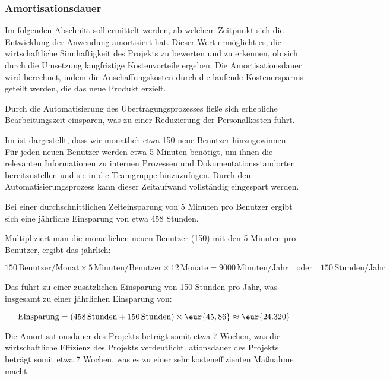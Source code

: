 
\subsubsection{Amortisationsdauer}
\label{sec:Amortisationsdauer}

Im folgenden Abschnitt soll ermittelt werden, ab welchem Zeitpunkt sich die Entwicklung der Anwendung amortisiert hat. Dieser Wert ermöglicht es, die wirtschaftliche Sinnhaftigkeit des Projekts zu bewerten und zu erkennen, ob sich durch die Umsetzung langfristige Kostenvorteile ergeben. Die Amortisationsdauer wird berechnet, indem die Anschaffungskosten durch die laufende Kostenersparnis geteilt werden, die das neue Produkt erzielt. 

Durch die Automatisierung des Übertragungsprozesses ließe sich erhebliche Bearbeitungszeit einsparen, was zu einer Reduzierung der Personalkosten führt.

Im  ist dargestellt, dass wir monatlich etwa 150 neue Benutzer hinzugewinnen. Für jeden neuen Benutzer werden etwa 5 Minuten benötigt, um ihnen die relevanten Informationen zu internen Prozessen und Dokumentationsstandorten bereitzustellen und sie in die Teamgruppe hinzuzufügen. Durch den Automatisierungsprozess kann dieser Zeitaufwand vollständig eingespart werden.

Bei einer durchschnittlichen Zeiteinsparung von 5 Minuten pro Benutzer ergibt sich eine jährliche Einsparung von etwa 458 Stunden.

Multipliziert man die monatlichen neuen Benutzer (150) mit den 5 Minuten pro Benutzer, ergibt das jährlich:

\[
150 \, \text{Benutzer/Monat} \times 5 \, \text{Minuten/Benutzer} \times 12 \, \text{Monate} = 9000 \, \text{Minuten/Jahr} \quad \text{oder} \quad 150 \, \text{Stunden/Jahr}
\]

Das führt zu einer zusätzlichen Einsparung von 150 Stunden pro Jahr, was insgesamt zu einer jährlichen Einsparung von:

\[
\text{Einsparung} = (458 \, \text{Stunden} + 150 \, \text{Stunden}) \times \eur{45,86} \approx \eur{24.320}
\]

Die Amortisationsdauer des Projekts beträgt somit etwa 7 Wochen, was die wirtschaftliche Effizienz des Projekts verdeutlicht.
ationsdauer des Projekts beträgt somit etwa 7 Wochen, was es zu einer sehr kosteneffizienten Maßnahme macht.

